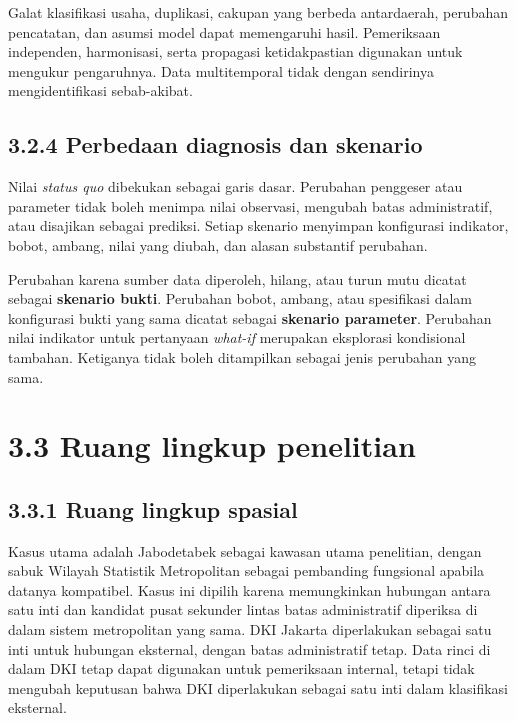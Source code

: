 \documentclass[
  indonesian,
  11pt,
  a4paper,
  oneside,
  openany]{report}
\begin{document}
Galat klasifikasi usaha, duplikasi, cakupan yang berbeda antardaerah,
perubahan pencatatan, dan asumsi model dapat memengaruhi hasil.
Pemeriksaan independen, harmonisasi, serta propagasi ketidakpastian
digunakan untuk mengukur pengaruhnya. Data multitemporal tidak dengan
sendirinya mengidentifikasi sebab-akibat.

\subsection{3.2.4 Perbedaan diagnosis dan
skenario}\label{perbedaan-diagnosis-dan-skenario}

Nilai \emph{status quo} dibekukan sebagai garis dasar. Perubahan
penggeser atau parameter tidak boleh menimpa nilai observasi, mengubah
batas administratif, atau disajikan sebagai prediksi. Setiap skenario
menyimpan konfigurasi indikator, bobot, ambang, nilai yang diubah, dan
alasan substantif perubahan.

Perubahan karena sumber data diperoleh, hilang, atau turun mutu dicatat
sebagai \textbf{skenario bukti}. Perubahan bobot, ambang, atau
spesifikasi dalam konfigurasi bukti yang sama dicatat sebagai
\textbf{skenario parameter}. Perubahan nilai indikator untuk pertanyaan
\emph{what-if} merupakan eksplorasi kondisional tambahan. Ketiganya
tidak boleh ditampilkan sebagai jenis perubahan yang sama.

\section{3.3 Ruang lingkup penelitian}\label{ruang-lingkup-penelitian}

\subsection{3.3.1 Ruang lingkup spasial}\label{ruang-lingkup-spasial}

Kasus utama adalah Jabodetabek sebagai kawasan utama penelitian, dengan
sabuk Wilayah Statistik Metropolitan sebagai pembanding fungsional
apabila datanya kompatibel. Kasus ini dipilih karena memungkinkan
hubungan antara satu inti dan kandidat pusat sekunder lintas batas
administratif diperiksa di dalam sistem metropolitan yang sama. DKI
Jakarta diperlakukan sebagai satu inti untuk hubungan eksternal, dengan
batas administratif tetap. Data rinci di dalam DKI tetap dapat digunakan
untuk pemeriksaan internal, tetapi tidak mengubah keputusan bahwa DKI
diperlakukan sebagai satu inti dalam klasifikasi eksternal.
\end{document}
